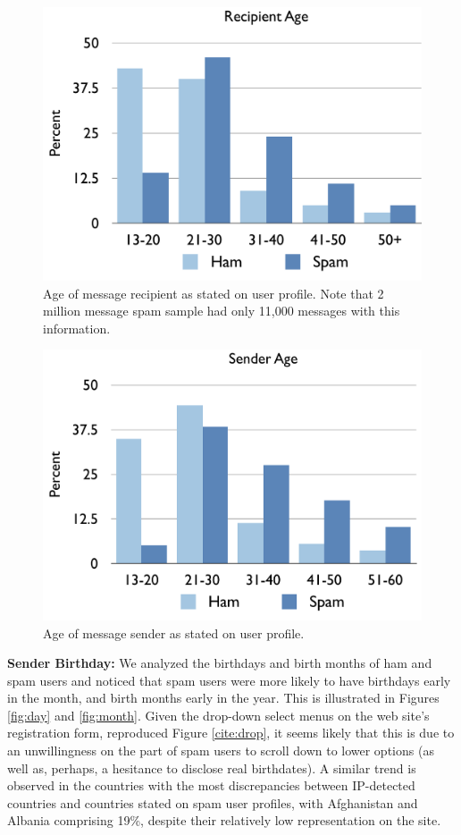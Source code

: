 \documentclass[preprint]{acm_proc_article-sp}
\begin{document}
\begin{figure}[h]
    \centering
    \includegraphics[width=\linewidth]{figures/recip-age.pdf}
    \caption{Age of message recipient as stated on user profile. Note that 2 million message spam sample 
        had only 11,000 messages with this information.}
    \label{fig:recipage}
\end{figure}

\begin{figure}[h]
    \centering
    \includegraphics[width=\linewidth]{figures/sender-age.pdf}
    \caption{Age of message sender as stated on user profile. }
    \label{fig:sendage}
\end{figure}

\textbf{Sender Birthday:} We analyzed the birthdays and birth months of ham and spam users and noticed that spam users 
were more likely to have birthdays early in the month, and birth months early in the year. This is illustrated in 
Figures \ref{fig:day} and \ref{fig:month}. Given the drop-down select menus on the web site's registration form, reproduced 
Figure \ref{cite:drop}, it seems likely that this is due to an unwillingness on the part of spam users to 
scroll down to lower options (as well as, perhaps, a hesitance to disclose real birthdates). A similar trend is 
observed in the countries with the most discrepancies between IP-detected countries and countries stated on spam 
user profiles, with Afghanistan and Albania comprising 19\%, despite their relatively low representation on the 
site. 
\end{document}
